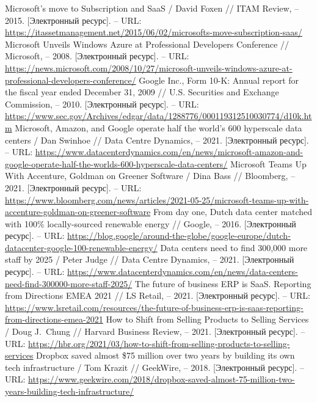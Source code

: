 \documentclass{article}
\begin{document}
\begin{thebibliography}{2}
 Microsoft's move to Subscription and SaaS / David Foxen // ITAM Review, – 2015. [Электронный ресурс]. – URL: \url{https://itassetmanagement.net/2015/06/02/microsofts-move-subscription-saas/}
 Microsoft Unveils Windows Azure at Professional Developers Conference // Microsoft, – 2008. [Электронный ресурс]. – URL: \url{https://news.microsoft.com/2008/10/27/microsoft-unveils-windows-azure-at-professional-developers-conference/}
 Google Inc., Form 10-K: Annual report for the fiscal year ended December 31, 2009 // U.S. Securities and Exchange Commission, – 2010. [Электронный ресурс]. – URL: \url{https://www.sec.gov/Archives/edgar/data/1288776/000119312510030774/d10k.htm}
 Microsoft, Amazon, and Google operate half the world’s 600 hyperscale data centers / Dan Swinhoe // Data Centre Dynamics, – 2021. [Электронный ресурс]. – URL: \url{https://www.datacenterdynamics.com/en/news/microsoft-amazon-and-google-operate-half-the-worlds-600-hyperscale-data-centers/}
 Microsoft Teams Up With Accenture, Goldman on Greener Software / Dina Bass // Bloomberg, – 2021. [Электронный ресурс]. – URL: \url{https://www.bloomberg.com/news/articles/2021-05-25/microsoft-teams-up-with-accenture-goldman-on-greener-software}
 From day one, Dutch data center matched with 100\% locally-sourced renewable energy // Google, – 2016. [Электронный ресурс]. – URL: \url{https://blog.google/around-the-globe/google-europe/dutch-datacenter-google-100-renewable-energy/}
 Data centers need to find 300,000 more staff by 2025 / Peter Judge // Data Centre Dynamics, – 2021. [Электронный ресурс]. – URL: \url{https://www.datacenterdynamics.com/en/news/data-centers-need-find-300000-more-staff-2025/}
 The future of business ERP is SaaS. Reporting from Directions EMEA 2021 // LS Retail, – 2021. [Электронный ресурс]. – URL: \url{https://www.lsretail.com/resources/the-future-of-business-erp-is-saas-reporting-from-directions-emea-2021}
 How to Shift from Selling Products to Selling Services / Doug J.~Chung // Harvard Business Review, – 2021. [Электронный ресурс]. – URL: \url{https://hbr.org/2021/03/how-to-shift-from-selling-products-to-selling-services}
 Dropbox saved almost \$75 million over two years by building its own tech infrastructure / Tom Krazit // GeekWire, – 2018. [Электронный ресурс]. – URL: \url{https://www.geekwire.com/2018/dropbox-saved-almost-75-million-two-years-building-tech-infrastructure/}

\end{thebibliography}
\end{document}
